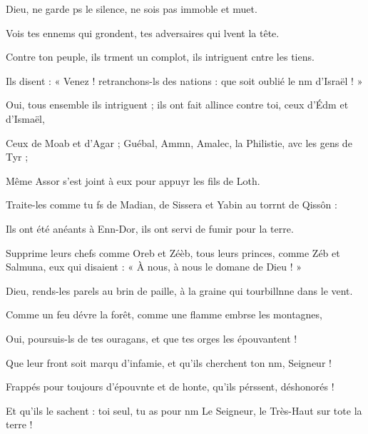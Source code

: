 \item Dieu, ne garde ps le silence,\psstar{} ne sois pas immoble et muet.
\item Vois tes ennems qui grondent,\psstar{} tes adversaires qui lvent la tête.
\item Contre ton peuple, ils trment un complot,\psstar{} ils intriguent cntre les tiens.
\item Ils disent : « Venez ! retranchons-ls des nations :\psstar{} que soit oublié le nm d'Israël ! »
\item Oui, tous ensemble ils intriguent ;\pscross{} ils ont fait allince contre toi,\psstar{} ceux d'Édm et d'Ismaël,
\item Ceux de Moab et d'Agar ;\pscross{} Guébal, Ammn, Amalec,\psstar{} la Philistie, avc les gens de Tyr ;
\item Même Assor s'est joint à eux\psstar{} pour appuyr les fils de Loth.
\item Traite-les comme tu fs de Madian,\psstar{} de Sissera et Yabin au torrnt de Qissôn :
\item Ils ont été anéants à Enn-Dor,\psstar{} ils ont servi de fumir pour la terre.
\item Supprime leurs chefs comme Oreb et Zéèb,\pscross{} tous leurs princes, comme Zéb et Salmuna,\psstar{} eux qui disaient : « À nous, à nous le domane de Dieu ! »
\item Dieu, rends-les parels au brin de paille,\psstar{} à la graine qui tourbillnne dans le vent.
\item Comme un feu dévre la forêt,\psstar{} comme une flamme embrse les montagnes,
\item Oui, poursuis-ls de tes ouragans,\psstar{} et que tes orges les épouvantent !
\item Que leur front soit marqu d'infamie,\psstar{} et qu'ils cherchent ton nm, Seigneur !
\item Frappés pour toujours d'épouvnte et de honte,\psstar{} qu'ils pérssent, déshonorés !
\item Et qu'ils le sachent :\pscross{} toi seul, tu as pour nm Le Seigneur,\psstar{} le Très-Haut sur tote la terre !